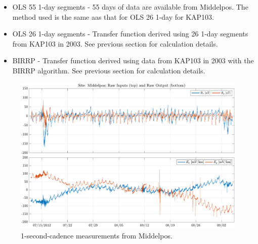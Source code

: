 \documentclass{article}
\begin{document}
\begin{itemize}

    \item OLS 55 1-day segments - 55 days of data are available from Middelpos. The method used is the same aas that for OLS 26 1-day for KAP103.

    \item OLS 26 1-day segments - Transfer function derived using 26 1-day segments from KAP103 in 2003. See previous section for calculation details.
    
    \item BIRRP - Transfer function derived using data from KAP103 in 2003 with the BIRRP algorithm. See previous section for calculation details.
    
\end{itemize}

\begin{figure}[h!]
\centering
\includegraphics[width=\textwidth]{figures/Middelpos/timeseries.pdf}
\caption{1-second-cadence measurements from Middelpos.}
\label{fig:KAP103_timeseries}
\end{figure}

\clearpage
\end{document}
